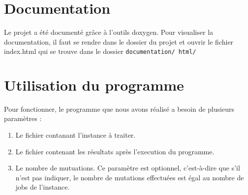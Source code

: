 	\paragraph{}

	\section{Documentation}
	
	\paragraph{}
	Le projet a été documenté grâce à l'outils doxygen. Pour visualiser la documentation, il faut se rendre dans le dossier du projet et ouvrir le fichier index.html qui se trouve dans le dossier \texttt{documentation/ html/}

	\section{Utilisation du programme}
	
	\paragraph{}
	Pour fonctionner, le programme que nous avons réalisé a besoin de plusieurs paramètres :
	\begin{enumerate}
		\item Le fichier contanant l'instance à traiter.
		\item Le fichier contenant les résultats après l'execution du programme.
		\item Le nombre de mutuations. Ce paramètre est optionnel, c'est-à-dire que s'il n'est pas indiquer, le nombre de mutations effectuées est égal au nombre de jobs de l'instance.
	\end{enumerate}	
%
